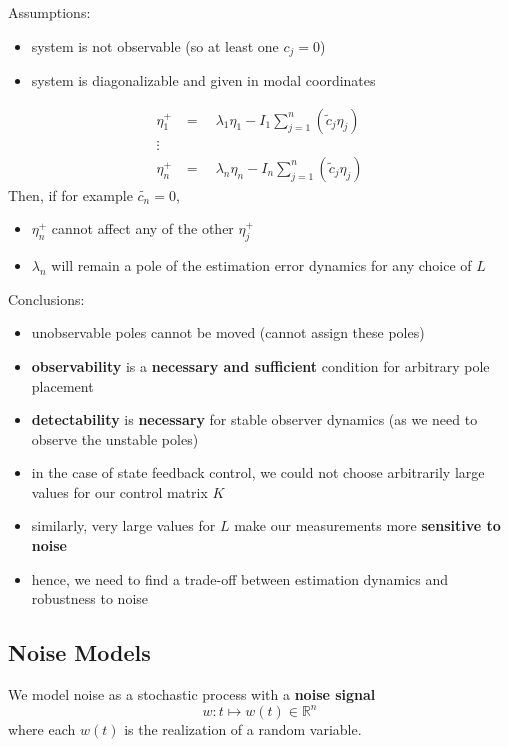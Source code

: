 
Assumptions:
\begin{itemize}
    \item system is not observable (so at least one $c_j=0$)
    \item system is diagonalizable and given in modal coordinates
\end{itemize}
\begin{align*}
    \eta_1^+ & =\quad\lambda_1\eta_1-I_1\sum_{j=1}^n\left(\tilde{c}_j\eta_j\right) \\
    \vdots                                                                         \\
    \eta_n^+ & =\quad\lambda_n\eta_n-I_n\sum_{j=1}^n\left(\tilde{c}_j\eta_j\right)
\end{align*}
Then, if for example $\tilde{c_n}=0$,
\begin{itemize}
    \item $\eta_n^+$ cannot affect any of the other $\eta_j^+$
    \item $\lambda_n$ will remain a pole of the estimation error dynamics for any choice of $L$
\end{itemize}
Conclusions:
\begin{itemize}
    \item unobservable poles cannot be moved (cannot assign these poles)
    \item \textbf{observability} is a \textbf{necessary and sufficient} condition for arbitrary pole placement
    \item \textbf{detectability} is \textbf{necessary} for stable observer dynamics (as we need to observe the unstable poles)
\end{itemize}


\begin{itemize}
    \item in the case of state feedback control, we could not choose arbitrarily large values for our control matrix $K$
    \item similarly, very large values for $L$ make our measurements more \textbf{sensitive to noise}
    \item hence, we need to find a trade-off between estimation dynamics and robustness to noise
\end{itemize}


\subsection{Noise Models}
We model noise as a stochastic process with a \textbf{noise signal}
\begin{equation*}
    w:t\mapsto w(t)\in\mathbb{R}^n
\end{equation*}where each $w(t)$ is the realization of a random variable.

